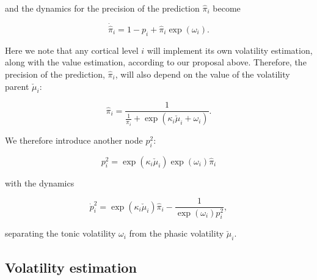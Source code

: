 and the dynamics for the precision of the prediction $\hat{\pi}_i$ become

\begin{equation}
	\dot{\hat{\pi}}_i = 1 - p_i + \hat{\pi}_i \exp(\omega_i).
\end{equation}

Here we note that any cortical level $i$ will implement its own volatility estimation, along with the value estimation, according to our proposal above. Therefore, the precision of the prediction, $\hat{\pi}_i$, will also depend on the value of the volatility parent $\check{\mu}_i$:

\begin{equation}
	\hat{\pi}_i = \frac{1}{\frac{1}{\pi_i} + \exp(\kappa_i \check{\mu}_i + \omega_i)}.
\end{equation}

We therefore introduce another node $p_i^2$:

\begin{equation}
	p_i^2 = \exp(\kappa_i \check{\mu}_i) \exp(\omega_i) \hat{\pi}_i
\end{equation}

with the dynamics

\begin{equation}
	\dot{p}_i^2 = \exp(\kappa_i \check{\mu}_i) \hat{\pi}_i - \frac{1}{\exp(\omega_i) p_i^2},
\end{equation}

separating the tonic volatility $\omega_i$ from the phasic volatility $\check{\mu}_i$.


\subsection{Volatility estimation}